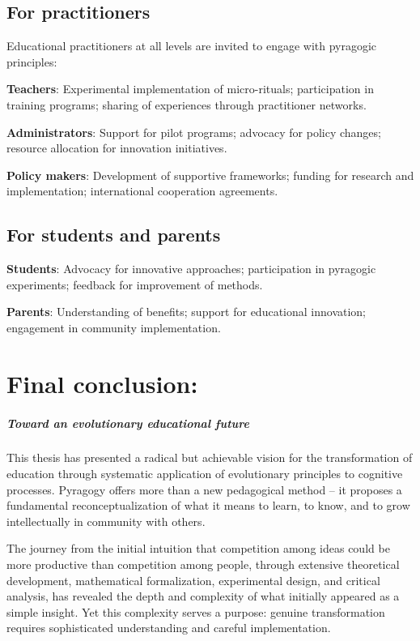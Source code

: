 \subsection{For practitioners}

Educational practitioners at all levels are invited to engage with pyragogic principles:

\textbf{Teachers}: Experimental implementation of micro-rituals; participation in training programs; sharing of experiences through practitioner networks.

\textbf{Administrators}: Support for pilot programs; advocacy for policy changes; resource allocation for innovation initiatives.

\textbf{Policy makers}: Development of supportive frameworks; funding for research and implementation; international cooperation agreements.

\subsection{For students and parents}

\textbf{Students}: Advocacy for innovative approaches; participation in pyragogic experiments; feedback for improvement of methods.

\textbf{Parents}: Understanding of benefits; support for educational innovation; engagement in community implementation.

\newpage
\section{Final conclusion:}
\subparagraph*{Toward an evolutionary educational future}

This thesis has presented a radical but achievable vision for the transformation of education through systematic application of evolutionary principles to cognitive processes. Pyragogy offers more than a new pedagogical method -- it proposes a fundamental reconceptualization of what it means to learn, to know, and to grow intellectually in community with others.

The journey from the initial intuition that competition among ideas could be more productive than competition among people, through extensive theoretical development, mathematical formalization, experimental design, and critical analysis, has revealed the depth and complexity of what initially appeared as a simple insight. Yet this complexity serves a purpose: genuine transformation requires sophisticated understanding and careful implementation.

